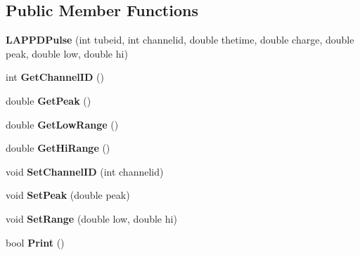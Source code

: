 \subsection*{Public Member Functions}
\begin{DoxyCompactItemize}
\item 
\hypertarget{classLAPPDPulse_ab6d60a683e420fd6304cc8d06b56e3f6}{{\bfseries L\-A\-P\-P\-D\-Pulse} (int tubeid, int channelid, double thetime, double charge, double peak, double low, double hi)}\label{classLAPPDPulse_ab6d60a683e420fd6304cc8d06b56e3f6}

\item 
\hypertarget{classLAPPDPulse_af0a8fed16c7b5c00f8bb644fb5b5a862}{int {\bfseries Get\-Channel\-I\-D} ()}\label{classLAPPDPulse_af0a8fed16c7b5c00f8bb644fb5b5a862}

\item 
\hypertarget{classLAPPDPulse_a86ef7d81b63accf60eea72dffd3c578d}{double {\bfseries Get\-Peak} ()}\label{classLAPPDPulse_a86ef7d81b63accf60eea72dffd3c578d}

\item 
\hypertarget{classLAPPDPulse_ac60601aee23092e71c13b953415d9d6d}{double {\bfseries Get\-Low\-Range} ()}\label{classLAPPDPulse_ac60601aee23092e71c13b953415d9d6d}

\item 
\hypertarget{classLAPPDPulse_a471f03a01ed49ef0db9438d13fe12200}{double {\bfseries Get\-Hi\-Range} ()}\label{classLAPPDPulse_a471f03a01ed49ef0db9438d13fe12200}

\item 
\hypertarget{classLAPPDPulse_ae3dad03fc206ae35ad7799ffe892f949}{void {\bfseries Set\-Channel\-I\-D} (int channelid)}\label{classLAPPDPulse_ae3dad03fc206ae35ad7799ffe892f949}

\item 
\hypertarget{classLAPPDPulse_a0c08b4bd1739552c7d6e2ad8cd9541e5}{void {\bfseries Set\-Peak} (double peak)}\label{classLAPPDPulse_a0c08b4bd1739552c7d6e2ad8cd9541e5}

\item 
\hypertarget{classLAPPDPulse_ae9345baa2efd05784e2b5c3c7023c194}{void {\bfseries Set\-Range} (double low, double hi)}\label{classLAPPDPulse_ae9345baa2efd05784e2b5c3c7023c194}

\item 
\hypertarget{classLAPPDPulse_a96fde20895fdcf61eb055308ed0b962d}{bool {\bfseries Print} ()}\label{classLAPPDPulse_a96fde20895fdcf61eb055308ed0b962d}

\end{DoxyCompactItemize}
